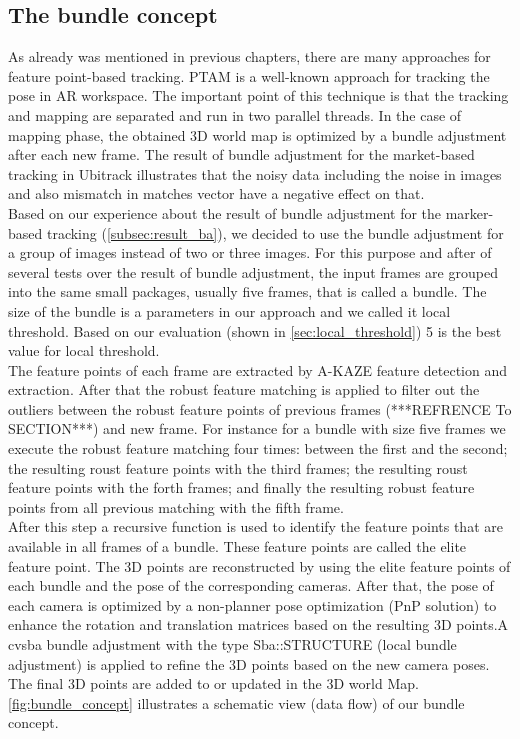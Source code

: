 \subsection{The bundle concept}
As already was mentioned in previous chapters, there are many approaches for feature point-based tracking. PTAM \cite{klein2007parallel} is a well-known approach for tracking the pose in AR workspace. The important point of this technique is that the tracking and mapping are separated and run in two parallel threads. In the case of mapping phase, the obtained 3D world map is optimized by a bundle adjustment after each new frame. The result of bundle adjustment for the market-based tracking in Ubitrack illustrates that the noisy data including the noise in images and also mismatch in matches vector have a negative effect on that.\\
Based on our experience about the result of bundle adjustment for the marker-based tracking (\autoref{subsec:result_ba}), we decided to use the bundle adjustment for a group of images instead of two or three images. For this purpose and after of several tests over the result of bundle adjustment, the input frames are grouped into the same small packages, usually five frames, that is called a bundle. The size of the bundle is a parameters in our approach and we called it local threshold. Based on our evaluation (shown in \autoref{sec:local_threshold}) 5 is the best value for local threshold.\\
The feature points of each frame are extracted by A-KAZE feature detection and extraction. After that the robust feature matching is applied to filter out the outliers between the robust feature points of previous frames (***REFRENCE To SECTION***) and new frame. For instance for a bundle with size five frames we execute the robust feature matching four times: between the first and the second; the resulting roust feature points with the third frames; the resulting roust feature points with the forth frames; and finally the resulting robust feature points from all previous matching with the fifth frame. \\
 After this step a recursive function is used to identify the feature points that are available in all frames of a bundle. These feature points are called the elite feature point. The 3D points are reconstructed by using the elite feature points of each bundle and the pose of the corresponding cameras. After that, the pose of each camera is optimized by a non-planner pose optimization (PnP solution) to enhance the rotation and translation matrices based on the resulting 3D points.A cvsba bundle adjustment with the type Sba::STRUCTURE (local bundle adjustment) is applied to refine the 3D points based on the new camera poses. The final 3D points are added to or updated in the 3D world Map.\\
\autoref{fig:bundle_concept} illustrates a schematic view (data flow) of our bundle concept.

